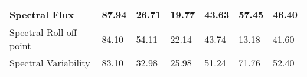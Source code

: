 \begin{table}[h!]
\begin{center}
{\begin{tabular}{|l|l|l|l|l|l|l|}
                        \hline Spectral Flux&

                        87.94
                        &
                        26.71
                        &
                        19.77
                        &
                        43.63
                        &
                        57.45
                        &
                        46.40
                        \\

                        \hline Spectral Roll off point&

                        84.10
                        &
                        54.11
                        &
                        22.14
                        &
                        43.74
                        &
                        13.18
                        &
                        41.60
                        \\

                        \hline Spectral Variability&

                        83.10
                        &
                        32.98
                        &
                        25.98
                        &
                        51.24
                        &
                        71.76
                        &
                        52.40
                        \\\hline

                \end{tabular}}
        \end{center}
\end{table}

